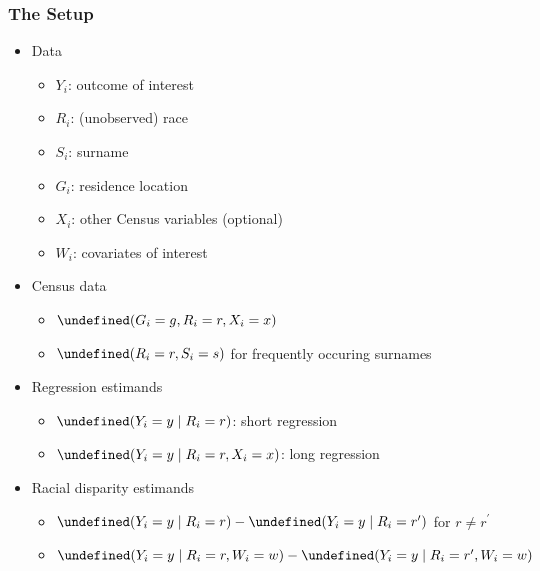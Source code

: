 \documentclass{beamer}
\let\Pr\undefined
\DeclareMathOperator{\Pr}{\mathbb{P}}
\begin{document}
\begin{frame}

\frametitle{The Setup}

\begin{itemize}
\item Data
  \begin{itemize}
  \item $Y_i$: outcome of interest 
  \item $R_i$: (unobserved) race
  \item $S_i$: surname
  \item $G_i$: residence location
  \item $X_i$: other Census variables (optional)
  \item $W_i$: covariates of interest
  \end{itemize}
\item Census data
  \begin{itemize}
  \item $\Pr(G_i = g, R_i = r, X_i = x)$
  \item $\Pr(R_i = r, S_i =s)$ for frequently occuring surnames
  \end{itemize}

  \vfill
\item Regression estimands
  \begin{itemize}
  \item $\Pr(Y_i = y \mid R_i = r)$: short regression
  \item $\Pr(Y_i = y \mid R_i = r, X_i =x)$: long regression 
  \end{itemize}

\item Racial disparity estimands
  \begin{itemize}
  \item $\Pr(Y_i =y \mid R_i = r) - \Pr(Y_i = y \mid R_i = r^\prime)$ for $r
    \ne r^\prime$
  \item $\Pr(Y_i = y \mid R_i = r, W_i = w) - \Pr(Y_i = y \mid R_i = r^\prime, W_i = w)$
  \end{itemize}

\end{itemize}
  
\end{frame}
\end{document}
